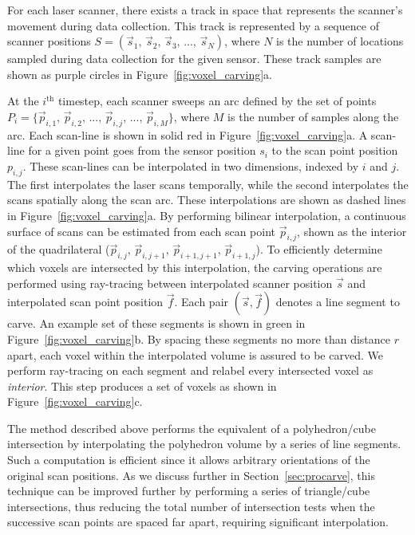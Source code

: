 \documentclass[12pt,onecolumn,oneside]{book}
\begin{document}
For each laser scanner, there exists a track in space that represents the scanner's movement during data collection.  This track is represented by a sequence of scanner positions $S = (\vec{s}_{1},\,\vec{s}_{2},\,\vec{s}_{3},\,...,\,\vec{s}_{N})$, where $N$ is the number of locations sampled during data collection for the given sensor.  These track samples are shown as purple circles in Figure~\ref{fig:voxel_carving}a.

At the $i^{\text{th}}$ timestep, each scanner sweeps an arc defined by the set of points $P_{i} = \{\vec{p}_{i,1},\,\vec{p}_{i,2},\,...,\,\vec{p}_{i,j},\,...,\,\vec{p}_{i,M}\}$, where $M$ is the number of samples along the arc.  Each scan-line is shown in solid red in Figure~\ref{fig:voxel_carving}a.  A scan-line for a given point goes from the sensor position $s_i$ to the scan point position $p_{i,j}$.  These scan-lines can be interpolated in two dimensions, indexed by $i$ and $j$.  The first interpolates the laser scans temporally, while the second interpolates the scans spatially along the scan arc.  These interpolations are shown as dashed lines in Figure~\ref{fig:voxel_carving}a.  By performing bilinear interpolation, a continuous surface of scans can be estimated from each scan point $\vec{p}_{i,j}$, shown as the interior of the quadrilateral ($\vec{p}_{i,j}$, $\vec{p}_{i,j+1}$, $\vec{p}_{i+1,j+1}$, $\vec{p}_{i+1,j}$).  To efficiently determine which voxels are intersected by this interpolation, the carving operations are performed using ray-tracing between interpolated scanner position $\vec{s}$ and interpolated scan point position $\vec{f}$.  Each pair $(\vec{s}, \vec{f})$ denotes a line segment to carve.  An example set of these segments is shown in green in Figure~\ref{fig:voxel_carving}b.  By spacing these segments no more than distance $r$ apart, each voxel within the interpolated volume is assured to be carved.  We perform ray-tracing on each segment and relabel every intersected voxel as {\it interior}.  This step produces a set of voxels as shown in Figure~\ref{fig:voxel_carving}c.

The method described above performs the equivalent of a polyhedron/cube intersection by interpolating the polyhedron volume by a series of line segments.  Such a computation is efficient since it allows arbitrary orientations of the original scan positions.  As we discuss further in Section~\ref{sec:procarve}, this technique can be improved further by performing a series of triangle/cube intersections, thus reducing the total number of intersection tests when the successive scan points are spaced far apart, requiring significant interpolation.
\end{document}
